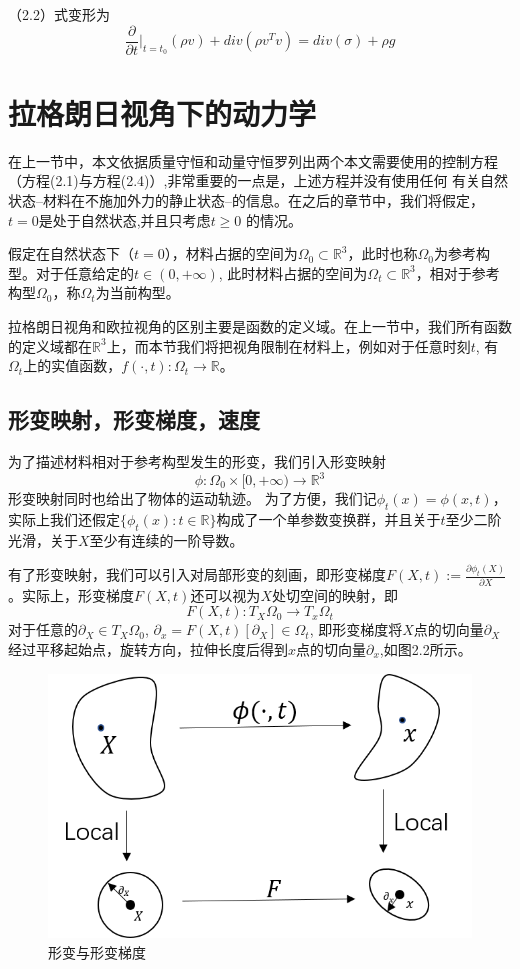 （2.2）式变形为
\begin{equation}
    \frac{\partial}{\partial t} \Big |_{t = t_0}(\rho v) + div(\rho v^{T}v) = div(\sigma) + \rho g
\end{equation}


\section{拉格朗日视角下的动力学}
在上一节中，本文依据质量守恒和动量守恒罗列出两个本文需要使用的控制方程（方程(2.1)与方程(2.4)）,非常重要的一点是，上述方程并没有使用任何
有关自然状态--材料在不施加外力的静止状态--的信息。在之后的章节中，我们将假定，$t=0$是处于自然状态,并且只考虑$t \ge 0$ 的情况。

假定在自然状态下（$t = 0$），材料占据的空间为$\Omega_0 \subset \mathbb{R}^3$，此时也称$\Omega_0$为参考构型。对于任意给定的$t\in (0,+\infty)$,
此时材料占据的空间为$\Omega_t \subset \mathbb{R}^3$，相对于参考构型$\Omega_0$，称$\Omega_t$为当前构型。

拉格朗日视角和欧拉视角的区别主要是函数的定义域。在上一节中，我们所有函数的定义域都在$\mathbb{R}^3$上，而本节我们将把视角限制在材料上，例如对于任意时刻$t$,
有$\Omega_t$上的实值函数，$f(\cdot,t) :\Omega_t \rightarrow \mathbb{R} $。

\subsection{形变映射，形变梯度，速度}
为了描述材料相对于参考构型发生的形变，我们引入形变映射 $$\phi:\Omega_0 \times [0,+\infty) \rightarrow \mathbb{R}^3$$
形变映射同时也给出了物体的运动轨迹。
为了方便，我们记$\phi_t (x) = \phi(x,t)$，实际上我们还假定$\{ \phi_t(x): t\in \mathbb{R}\}$构成了一个单参数变换群，并且关于$t$至少二阶光滑，关于$X$至少有连续的一阶导数。

有了形变映射，我们可以引入对局部形变的刻画，即形变梯度$F(X,t):=\frac{\partial \phi_t(X)}{\partial X}$。实际上，形变梯度$F(X,t)$还可以视为$X$处切空间的映射，即
$$F(X,t):T_X \Omega_0 \rightarrow T_x \Omega_t$$
对于任意的$\partial_X \in T_X \Omega_0$, $\partial_x = F(X,t)[\partial_X] \in \Omega_t$,
即形变梯度将$X$点的切向量$\partial_X$经过平移起始点，旋转方向，拉伸长度后得到$x$点的切向量$\partial_x$,如图2.2所示。
\begin{figure}[htbp]
    \centering
    \includegraphics[scale=1.0]{./images/image2.png}
    \caption[形变与形变梯度]{形变与形变梯度}
    \label{fig:deformation gradient}
\end{figure}

